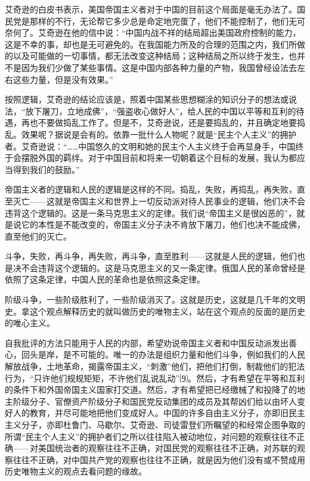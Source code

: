 \documentclass[UTF-8, a5paper, 12pt]{ctexart}
\begin{document}
艾奇逊的白皮书表示，美国帝国主义者对于中国的目前这个局面是毫无办法了。国民党是那样的不行，无论帮它多少总是命定地完蛋了，他们不能控制了，他们无可奈何了。艾奇逊在他的信中说：“中国内战不祥的结局超出美国政府控制的能力，这是不幸的事，却也是无可避免的。在我国能力所及的合理的范围之内，我们所做的以及可能做的一切事情，都无法改变这种结局；这种结局之所以终于发生，也并不是因为我们少做了某些事情。这是中国内部各种力量的产物，我国曾经设法去左右这些力量，但是没有效果。”

按照逻辑，艾奇逊的结论应该是，照着中国某些思想糊涂的知识分子的想法或说法，“放下屠刀，立地成佛”，“强盗收心做好人”，给人民的中国以平等和互利的待遇，再也不要做捣乱工作了。但是不，艾奇逊说，还是要捣乱的，并且确定地要捣乱。效果呢？据说是会有的。依靠一批什么人物呢？就是“民主个人主义”的拥护者。艾奇逊说：“……中国悠久的文明和她的民主个人主义终于会再显身手，中国终于会摆脱外国的羁绊。对于中国目前和将来一切朝着这个目标的发展，我认为都应当得到我们的鼓励。”

帝国主义者的逻辑和人民的逻辑是这样的不同。捣乱，失败，再捣乱，再失败，直至灭亡——这就是帝国主义和世界上一切反动派对待人民事业的逻辑，他们决不会违背这个逻辑的。这是一条马克思主义的定律。我们说“帝国主义是很凶恶的”，就是说它的本性是不能改变的，帝国主义分子决不肯放下屠刀，他们也决不能成佛，直至他们的灭亡。

斗争，失败，再斗争，再失败，再斗争，直至胜利——这就是人民的逻辑，他们也是决不会违背这个逻辑的。这是马克思主义的又一条定律。俄国人民的革命曾经是依照了这条定律，中国人民的革命也是依照这条定律。

阶级斗争，一些阶级胜利了，一些阶级消灭了。这就是历史，这就是几千年的文明史。拿这个观点解释历史的就叫做历史的唯物主义，站在这个观点的反面的是历史的唯心主义。

自我批评的方法只能用于人民的内部，希望劝说帝国主义者和中国反动派发出善心，回头是岸，是不可能的。唯一的办法是组织力量和他们斗争，例如我们的人民解放战争，土地革命，揭露帝国主义，“刺激”他们，把他们打倒，制裁他们的犯法行为，“只许他们规规矩矩，不许他们乱说乱动”⑼。然后，才有希望在平等和互利的条件下和外国帝国主义国家打交道。然后，才有希望把已经缴械了和投降了的地主阶级分子、官僚资产阶级分子和国民党反动集团的成员及其帮凶们给以由坏人变好人的教育，并尽可能地把他们变成好人。中国的许多自由主义分子，亦即旧民主主义分子，亦即杜鲁门、马歇尔、艾奇逊、司徒雷登们所瞩望的和经常企图争取的所谓“民主个人主义”的拥护者们之所以往往陷入被动地位，对问题的观察往往不正确——对美国统治者的观察往往不正确，对国民党的观察往往不正确，对苏联的观察往往不正确，对中国共产党的观察也往往不正确，就是因为他们没有或不赞成用历史唯物主义的观点去看问题的缘故。
\end{document}
